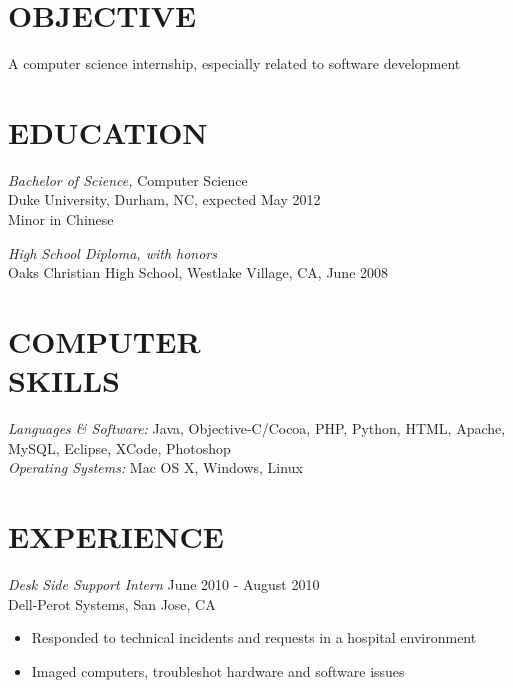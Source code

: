 \documentclass[line,margin]{res}
\begin{document}
	\setlength{\pdfpageheight}{\paperheight}
	\setlength{\pdfpagewidth}{\paperwidth}
\address{Duke University, Box 94807, Durham, NC 27708}
\address{alex@galonsky.com \hspace{.93in} REDACTED}

 
\begin{resume}
 
\section{OBJECTIVE}       A computer science internship, especially related to software development
 
 
\section{EDUCATION} {\sl Bachelor of Science,} Computer Science \\
                Duke University, Durham, NC, 
                expected May 2012 \\
				Minor in Chinese

				{\sl High School Diploma, with honors} \\
				Oaks Christian High School, Westlake Village, CA, June 2008
 
 
\section{COMPUTER \\ SKILLS} {\sl Languages \& Software:} Java, Objective-C/Cocoa, PHP, Python, HTML, Apache, MySQL, Eclipse, XCode, Photoshop \\
                {\sl Operating Systems:} Mac OS X, Windows, Linux
 
\section{EXPERIENCE} 
				
	{\sl Desk Side Support Intern} \hfill June 2010 - August 2010 \\
                Dell-Perot Systems, San Jose, CA
                 \begin{itemize}  \itemsep -2pt %
                 \item Responded to technical incidents and requests in a hospital environment
		 \item Imaged computers, troubleshot hardware and software issues
                \end{itemize}


\end{resume}
\end{document}
